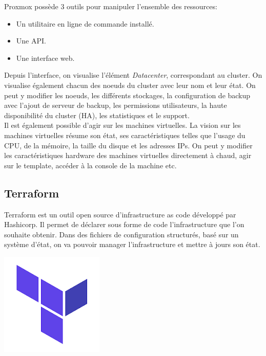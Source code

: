 \documentclass[12pt]{article}
\begin{document}
\begin{minipage}{.53\textwidth}%
Proxmox possède 3 outils pour manipuler l'ensemble des ressources:
 \begin{itemize}
     \item Un utilitaire en ligne de commande installé.
     \item Une API.
     \item Une interface web.
 \end{itemize}

Depuis l'interface, on visualise l'élément \textit{Datacenter}, correspondant au cluster. 
On visualise également chacun des noeuds du cluster avec leur nom et leur état. 
On peut y modifier les noeuds, les différents stockages, la configuration de backup avec l'ajout de serveur de backup, les permissions utilisateurs, la haute disponibilité du cluster (HA), les statistiques et le support. \\

Il est également possible d'agir sur les machines virtuelles. 
La vision sur les machines virtuelles résume son état, ses caractéristiques telles que l'usage du CPU, de la mémoire, la taille du disque et les adresses IPs. 
On peut y modifier les caractéristiques hardware des machines virtuelles directement à chaud, agir sur le template, accéder à la console de la machine etc. \\
\end{minipage}%

\newpage
\subsection{Terraform}
\noindent%
\begin{minipage}{.7\textwidth}%
Terraform est un outil open source d'infrastructure as code développé par Hashicorp. 
Il permet de déclarer sous forme de code l'infrastructure que l'on souhaite obtenir. 
Dans des fichiers de configuration structurés, basé sur un système d'état, on va pouvoir manager l'infrastructure et mettre à jours son état. \\

\end{minipage}%
\hfill
\begin{minipage}{.3\textwidth}%
\begin{center}
\includegraphics[scale=0.5]{src/logo_terraform.png}
\end{center}
\end{minipage}%
\end{document}
